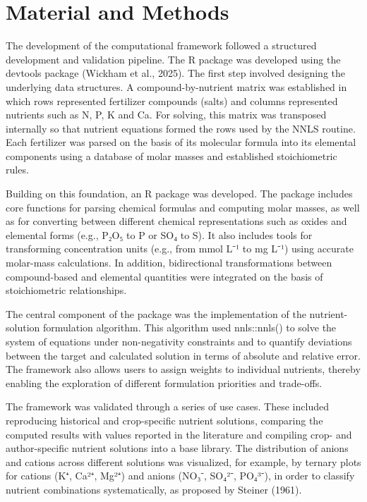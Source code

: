 \documentclass[
  letterpaper,
  DIV=11,
  numbers=noendperiod]{scrreprt}
\begin{document}
\chapter{Material and Methods}\label{material-and-methods}

The development of the computational framework followed a structured
development and validation pipeline. The R package was developed using
the devtools package (Wickham et al., 2025). The first step involved
designing the underlying data structures. A compound-by-nutrient matrix
was established in which rows represented fertilizer compounds (salts)
and columns represented nutrients such as N, P, K and Ca. For solving,
this matrix was transposed internally so that nutrient equations formed
the rows used by the NNLS routine. Each fertilizer was parsed on the
basis of its molecular formula into its elemental components using a
database of molar masses and established stoichiometric rules.

Building on this foundation, an R package was developed. The package
includes core functions for parsing chemical formulas and computing
molar masses, as well as for converting between different chemical
representations such as oxides and elemental forms (e.g., P₂O₅ to P or
SO₄ to S). It also includes tools for transforming concentration units
(e.g., from mmol L⁻¹ to mg L⁻¹) using accurate molar-mass calculations.
In addition, bidirectional transformations between compound-based and
elemental quantities were integrated on the basis of stoichiometric
relationships.

The central component of the package was the implementation of the
nutrient-solution formulation algorithm. This algorithm used
nnls::nnls() to solve the system of equations under non-negativity
constraints and to quantify deviations between the target and calculated
solution in terms of absolute and relative error. The framework also
allows users to assign weights to individual nutrients, thereby enabling
the exploration of different formulation priorities and trade-offs.

The framework was validated through a series of use cases. These
included reproducing historical and crop-specific nutrient solutions,
comparing the computed results with values reported in the literature
and compiling crop- and author-specific nutrient solutions into a base
library. The distribution of anions and cations across different
solutions was visualized, for example, by ternary plots for cations (K⁺,
Ca²⁺, Mg²⁺) and anions (NO₃⁻, SO₄²⁻, PO₄³⁻), in order to classify
nutrient combinations systematically, as proposed by Steiner (1961).
\end{document}
